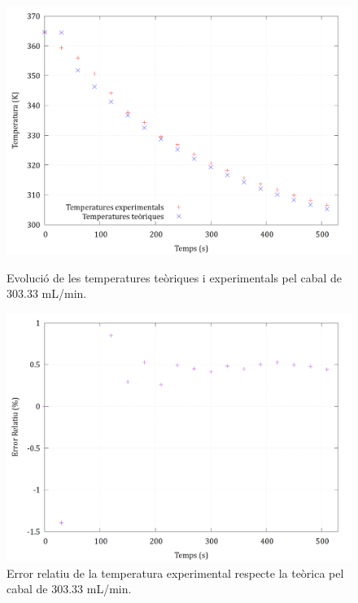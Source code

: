 \documentclass[10pt, twoside]{article}
\begin{document}
\begin{figure}[H]
    \centering
    \begin{minipage}{0.45\linewidth}
        \centering
        \includegraphics[width=\linewidth]{303.png}
        \caption{Evolució de les temperatures teòriques i experimentals pel cabal de 303.33 mL/min.}
    \end{minipage}
    \hspace{0.05\linewidth}
    \begin{minipage}{0.45\linewidth}
        \centering
        \includegraphics[width=\linewidth]{303error.png}
        \caption{Error relatiu de la temperatura experimental respecte la teòrica pel cabal de 303.33 mL/min.}
    \end{minipage}
\end{figure}
\end{document}
